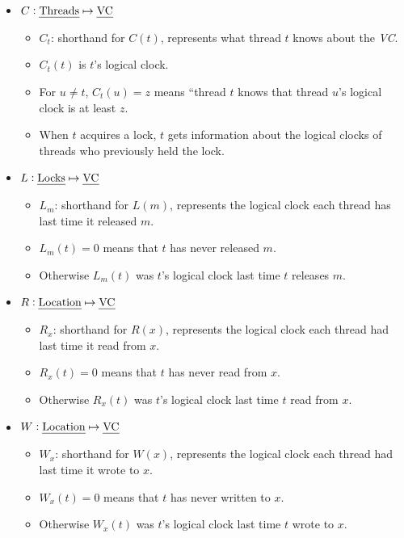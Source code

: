 \documentclass[twocolumn,landscape,10pt]{article}
\theoremstyle{definition}
\begin{document}
\begin{itemize}
    \item $C:\text{\emph{Threads}}\mapsto\text{\emph{VC}}$
        \begin{itemize}
            \item $C_t$: shorthand for $C(t)$, represents what thread $t$ knows
                about the \emph{VC}.
            \item $C_t(t)$ is $t$'s logical clock.
            \item For $u\neq t$, $C_t(u)=z$ means ``thread $t$ knows that thread
                $u$'s logical clock is at least $z$.
            \item When $t$ acquires a lock, $t$ gets information about the
                logical clocks of threads who previously held the lock.
        \end{itemize} 
    \item $L:\text{\emph{Locks}}\mapsto\text{\emph{VC}}$
        \begin{itemize}
            \item $L_m$: shorthand for $L(m)$, represents the logical clock each
                thread has last time it released $m$.
            \item $L_m(t)=0$ means that $t$ has never released $m$.
            \item Otherwise $L_m(t)$ was $t$'s logical clock last time $t$
                releases $m$.
        \end{itemize} 
    \item $R:\text{\emph{Location}}\mapsto\text{\emph{VC}}$
        \begin{itemize}
            \item $R_x$: shorthand for $R(x)$, represents the logical clock each
                thread had last time it read from $x$.
            \item $R_x(t)=0$ means that $t$ has never read from $x$.
            \item Otherwise $R_x(t)$ was $t$'s logical clock last time $t$
                read from $x$.
        \end{itemize} 
    \item $W:\text{\emph{Location}}\mapsto\text{\emph{VC}}$
        \begin{itemize}
            \item $W_x$: shorthand for $W(x)$, represents the logical clock each
                thread had last time it wrote to $x$.
            \item $W_x(t)=0$ means that $t$ has never written to $x$.
            \item Otherwise $W_x(t)$ was $t$'s logical clock last time $t$
                wrote to $x$.
        \end{itemize} 
\end{itemize} 
\end{document}
